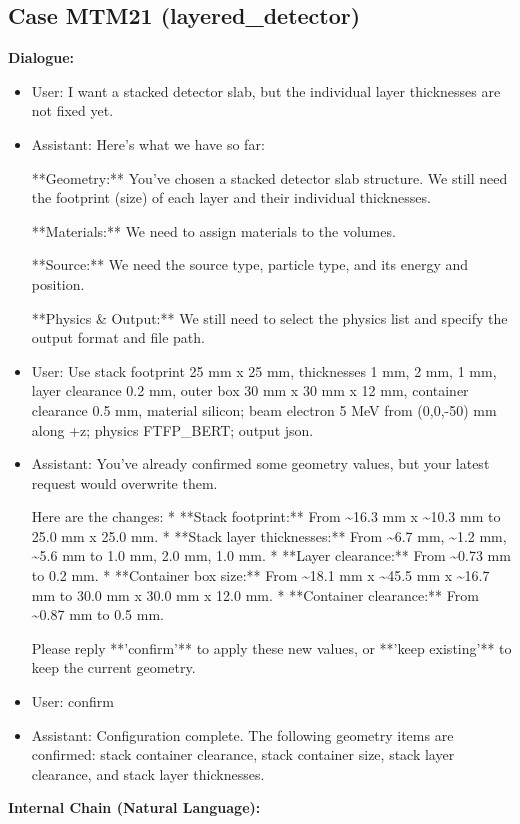 \documentclass[11pt]{ctexart}
\begin{document}
\subsection{Case MTM21 (layered\_detector)}
\textbf{Dialogue:}
\begin{itemize}
\item User: I want a stacked detector slab, but the individual layer thicknesses are not fixed yet.
\item Assistant: Here's what we have so far:

**Geometry:** You've chosen a stacked detector slab structure. We still need the footprint (size) of each layer and their individual thicknesses.

**Materials:** We need to assign materials to the volumes.

**Source:** We need the source type, particle type, and its energy and position.

**Physics \& Output:** We still need to select the physics list and specify the output format and file path.
\item User: Use stack footprint 25 mm x 25 mm, thicknesses 1 mm, 2 mm, 1 mm, layer clearance 0.2 mm, outer box 30 mm x 30 mm x 12 mm, container clearance 0.5 mm, material silicon; beam electron 5 MeV from (0,0,-50) mm along +z; physics FTFP\_BERT; output json.
\item Assistant: You've already confirmed some geometry values, but your latest request would overwrite them.

Here are the changes:
*   **Stack footprint:** From \textasciitilde{}16.3 mm x \textasciitilde{}10.3 mm to 25.0 mm x 25.0 mm.
*   **Stack layer thicknesses:** From \textasciitilde{}6.7 mm, \textasciitilde{}1.2 mm, \textasciitilde{}5.6 mm to 1.0 mm, 2.0 mm, 1.0 mm.
*   **Layer clearance:** From \textasciitilde{}0.73 mm to 0.2 mm.
*   **Container box size:** From \textasciitilde{}18.1 mm x \textasciitilde{}45.5 mm x \textasciitilde{}16.7 mm to 30.0 mm x 30.0 mm x 12.0 mm.
*   **Container clearance:** From \textasciitilde{}0.87 mm to 0.5 mm.

Please reply **'confirm'** to apply these new values, or **'keep existing'** to keep the current geometry.
\item User: confirm
\item Assistant: Configuration complete. The following geometry items are confirmed: stack container clearance, stack container size, stack layer clearance, and stack layer thicknesses.
\end{itemize}
\textbf{Internal Chain (Natural Language):}
\end{document}
